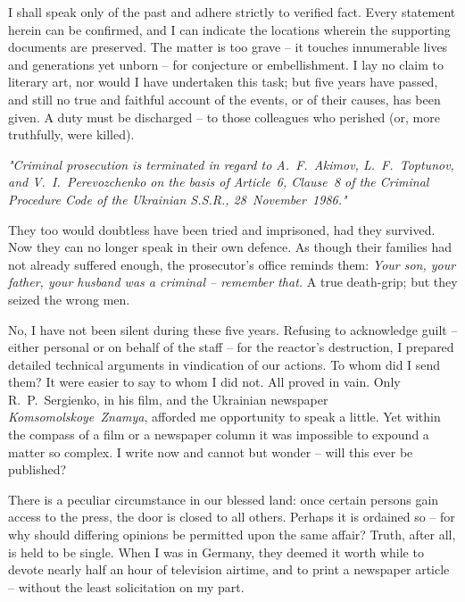 \documentclass[openright]{bookest}
\begin{document}
I shall speak only of the past and adhere strictly to verified fact. Every statement herein can be confirmed, and I can indicate the locations wherein the supporting documents are preserved. The matter is too grave -- it touches innumerable lives and generations yet unborn -- for conjecture or embellishment. I lay no claim to literary art, nor would I have undertaken this task; but five years have passed, and still no true and faithful account of the events, or of their causes, has been given. A duty must be discharged -- to those colleagues who perished (or, more truthfully, were killed).


\begin{personal}
\par \textit{"Criminal prosecution is terminated in regard to A.~F.~Akimov, L.~F.~Toptunov, and V.~I.~Perevozchenko on the basis of Article~6, Clause~8 of the Criminal Procedure Code of the Ukrainian S.S.R., 28~November~1986."}
\end{personal}

They too would doubtless have been tried and imprisoned, had they survived. Now they can no longer speak in their own defence. As though their families had not already suffered enough, the prosecutor's office reminds them: \textit{Your son, your father, your husband was a criminal -- remember that.} A true death-grip; but they seized the wrong men.

No, I have not been silent during these five years. Refusing to acknowledge guilt -- either personal or on behalf of the staff -- for the reactor's destruction, I prepared detailed technical arguments in vindication of our actions. To whom did I send them? It were easier to say to whom I did not. All proved in vain. Only R.~P.~Sergienko, in his film, and the Ukrainian newspaper \textit{Komsomolskoye~Znamya}, afforded me opportunity to speak a little. Yet within the compass of a film or a newspaper column it was impossible to expound a matter so complex. I write now and cannot but wonder -- will this ever be published?

There is a peculiar circumstance in our blessed land: once certain persons gain access to the press, the door is closed to all others. Perhaps it is ordained so -- for why should differing opinions be permitted upon the same affair? Truth, after all, is held to be single. When I was in Germany, they deemed it worth while to devote nearly half an hour of television airtime, and to print a newspaper article -- without the least solicitation on my part.
\end{document}
